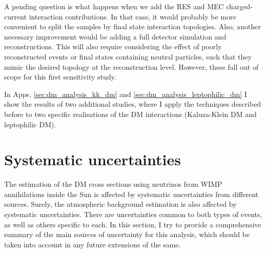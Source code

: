 A pending question is what happens when we add the RES and MEC charged-current interaction contributions. In that case, it would probably be more convenient to split the samples by final state interaction topologies. Also, another necessary improvement would be adding a full detector simulation and reconstructions. This will also require considering the effect of poorly reconstructed events or final states containing neutral particles, such that they mimic the desired topology at the reconstruction level. However, these fall out of scope for this first sensitivity study.

In Apps. \ref{sec:dm_analysis_kk_dm} and \ref{sec:dm_analysis_leptophilic_dm} I show the results of two additional studies, where I apply the techniques described before to two specific realisations of the DM interactions (Kaluza-Klein DM and leptophilic DM).

\section{Systematic uncertainties}
\label{sec:dm_analysis_systematics}

The estimation of the DM cross sections using neutrinos from WIMP annihilations inside the Sun is affected by systematic uncertainties from different sources. Surely, the atmospheric background estimation is also affected by systematic uncertainties. There are uncertainties common to both types of events, as well as others specific to each. In this section, I try to provide a comprehensive summary of the main sources of uncertainty for this analysis, which should be taken into account in any future extensions of the same.

